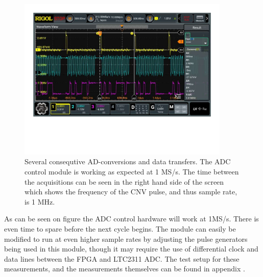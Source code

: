 \begin{figure}[H]
    \centering
    \includegraphics[clip, trim=0 150 0 0, width=0.9\textwidth]{Sections/7_SystemDesign/Figures/7_2_8_ADC_CONTROL_1MEGSAMPLE_MEAS.pdf}
    \caption{Several consequtive AD-conversions and data transfers. The ADC control module is working as expected at 1 MS/s. The time between the acquisitions can be seen in the right hand side of the screen which shows the frequency of the CNV pulse, and thus sample rate, is 1 MHz.}
    \label{fig:7_2_8_ADC_CONTROL_1MEGASAMPLE}
\end{figure}

As can be seen on figure  the ADC control hardware will work at 1MS/s. There is even time to spare before the next cycle begins. The module can easily be modified to run at even higher sample rates by adjusting the pulse generators being used in this module, though it may require the use of differential clock and data lines between the FPGA and LTC2311 ADC. The test setup for these measurements, and the measurements themselves can be found in appendix .